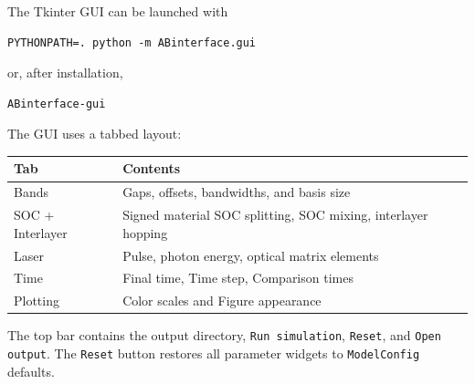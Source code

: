 \documentclass[11pt,a4paper]{article}
\begin{document}
The Tkinter GUI can be launched with
\begin{lstlisting}
PYTHONPATH=. python -m ABinterface.gui
\end{lstlisting}
or, after installation,
\begin{lstlisting}
ABinterface-gui
\end{lstlisting}
The GUI uses a tabbed layout:
\begin{center}
\begin{tabular}{ll}
\toprule
Tab & Contents \\
\midrule
Bands & Gaps, offsets, bandwidths, and basis size \\
SOC + Interlayer & Signed material SOC splitting, SOC mixing, interlayer hopping \\
Laser & Pulse, photon energy, optical matrix elements \\
Time & Final time, Time step, Comparison times \\
Plotting & Color scales and Figure appearance \\
\bottomrule
\end{tabular}
\end{center}
The top bar contains the output directory, \texttt{Run simulation}, \texttt{Reset}, and \texttt{Open output}.  The \texttt{Reset} button restores all parameter widgets to \texttt{ModelConfig} defaults.
\end{document}
